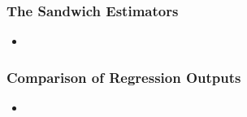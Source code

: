 \documentclass{beamer}
\begin{document}
\begin{frame}[fragile]\frametitle{The Sandwich Estimators}

	
	\begin{itemize}
	
		\item 

	\end{itemize}

\end{frame}



\begin{frame}[fragile]\frametitle{Comparison of Regression Outputs}

	
	\begin{itemize}
	
		\item 

	\end{itemize}

\end{frame}
\end{document}
